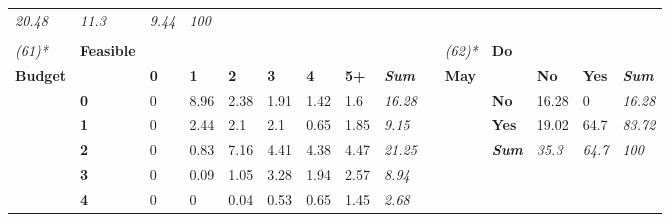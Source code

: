 \begin{table}
{\begin{threeparttable}
\begin{tabular}{lllllllllllllll}
  \textit{20.48} &
  \textit{11.3} &
  \textit{9.44} &
  \textit{100} &
  \textit{} &
  \textit{} &
  \textit{} &
  \textit{} &
  \textit{} &
  \textit{} \\
\textit{} &
  \textit{\textbf{}} &
  \textit{} &
  \textit{} &
  \textit{} &
  \textit{} &
  \textit{} &
  \textit{} &
  \textit{} &
  \textit{} &
  \textit{} &
  \textit{} &
  \textit{} &
  \textit{} &
  \textit{} \\
\textit{(61)*} &
  \textbf{Feasible} &
   &
   &
   &
   &
   &
   &
  \textit{} &
   &
  \textit{(62)*} &
  \textbf{Do} &
   &
   &
  \textit{} \\
\textbf{Budget} &
   &
  \textbf{0} &
  \textbf{1} &
  \textbf{2} &
  \textbf{3} &
  \textbf{4} &
  \textbf{5+} &
  \textit{\textbf{Sum}} &
  \textbf{} &
  \textbf{May} &
   &
  \textbf{No} &
  \textbf{Yes} &
  \textit{\textbf{Sum}} \\
 &
  \textbf{0} &
  \cellcolor[HTML]{FFFFFF}0 &
  \cellcolor[HTML]{BCBCBC}8.96 &
  \cellcolor[HTML]{EEEEEE}2.38 &
  \cellcolor[HTML]{F1F1F1}1.91 &
  \cellcolor[HTML]{F5F5F5}1.42 &
  \cellcolor[HTML]{F3F3F3}1.6 &
  \textit{16.28} &
   &
   &
  \textbf{No} &
  \cellcolor[HTML]{E9E9E9}16.28 &
  \cellcolor[HTML]{FFFFFF}0 &
  \textit{16.28} \\
 &
  \textbf{1} &
  \cellcolor[HTML]{FFFFFF}0 &
  \cellcolor[HTML]{EDEDED}2.44 &
  \cellcolor[HTML]{F0F0F0}2.1 &
  \cellcolor[HTML]{F0F0F0}2.1 &
  \cellcolor[HTML]{FBFBFB}0.65 &
  \cellcolor[HTML]{F2F2F2}1.85 &
  \textit{9.15} &
   &
   &
  \textbf{Yes} &
  \cellcolor[HTML]{E5E5E5}19.02 &
  \cellcolor[HTML]{A6A6A6}64.7 &
  \textit{83.72} \\
 &
  \textbf{2} &
  \cellcolor[HTML]{FFFFFF}0 &
  \cellcolor[HTML]{F9F9F9}0.83 &
  \cellcolor[HTML]{C9C9C9}7.16 &
  \cellcolor[HTML]{DEDEDE}4.41 &
  \cellcolor[HTML]{DEDEDE}4.38 &
  \cellcolor[HTML]{DEDEDE}4.47 &
  \textit{21.25} &
   &
   &
  \textit{\textbf{Sum}} &
  \textit{35.3} &
  \textit{64.7} &
  \textit{100} \\
 &
  \textbf{3} &
  \cellcolor[HTML]{FFFFFF}0 &
  \cellcolor[HTML]{FFFFFF}0.09 &
  \cellcolor[HTML]{F8F8F8}1.05 &
  \cellcolor[HTML]{E7E7E7}3.28 &
  \cellcolor[HTML]{F1F1F1}1.94 &
  \cellcolor[HTML]{ECECEC}2.57 &
  \textit{8.94} &
   &
   &
   &
   &
   &
  \textit{} \\
 &
  \textbf{4} &
  \cellcolor[HTML]{FFFFFF}0 &
  \cellcolor[HTML]{FFFFFF}0 &
  \cellcolor[HTML]{FFFFFF}0.04 &
  \cellcolor[HTML]{FBFBFB}0.53 &
  \cellcolor[HTML]{FBFBFB}0.65 &
  \cellcolor[HTML]{F5F5F5}1.45 &
  \textit{2.68} &
   &
   &
   &
   &

\end{tabular}
\end{threeparttable}}
\end{table}
